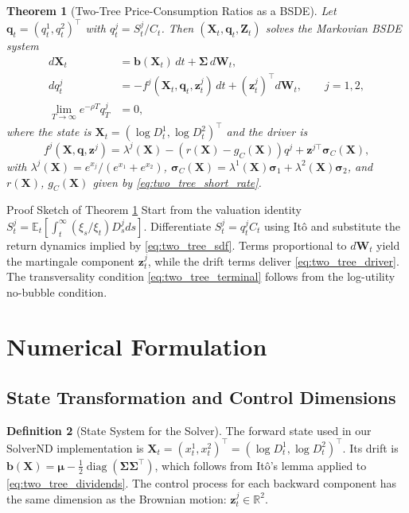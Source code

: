 \documentclass[11pt,letterpaper,oneside]{article}
\theoremstyle{plain}
\newtheorem{theorem}{Theorem}[section]
\theoremstyle{definition}
\newtheorem{definition}[theorem]{Definition}
\theoremstyle{remark}
\begin{document}
\begin{theorem}[Two-Tree Price-Consumption Ratios as a BSDE]
\label{thm:two_tree_bsde}
Let $\bm{q}_t = (q^1_t,q^2_t)^\top$ with $q^j_t = S^j_t / C_t$. Then $(\bm{X}_t, \bm{q}_t, \bm{Z}_t)$ solves the Markovian BSDE system
\begin{align}
  d\bm{X}_t &= \bm{b}(\bm{X}_t)\,dt + \bm{\Sigma}\,d\bm{W}_t, \label{eq:two_tree_forward} \\
  dq^j_t &= -f^j(\bm{X}_t, \bm{q}_t, \bm{z}^j_t)\,dt + (\bm{z}^j_t)^\top d\bm{W}_t, \qquad j=1,2, \label{eq:two_tree_backward} \\
  \lim_{T\to\infty} e^{-\rho T} q^j_T &= 0, \label{eq:two_tree_terminal}
\end{align}
where the state is $\bm{X}_t = (\log D^1_t, \log D^2_t)^\top$ and the driver is
\begin{equation}
\label{eq:two_tree_driver}
  f^j(\bm{X}, \bm{q}, \bm{z}^j) = \lambda^j(\bm{X}) - ( r(\bm{X}) - g_C(\bm{X}) ) q^j + \bm{z}^{j\top} \bm{\sigma}_C(\bm{X}),
\end{equation}
with $\lambda^j(\bm{X}) = e^{x_j}/(e^{x_1} + e^{x_2})$, $\bm{\sigma}_C(\bm{X}) = \lambda^1(\bm{X}) \bm{\sigma}_1 + \lambda^2(\bm{X}) \bm{\sigma}_2$, and $r(\bm{X})$, $g_C(\bm{X})$ given by \eqref{eq:two_tree_short_rate}.
\end{theorem}

\begin{leanproofbox}{Proof Sketch of Theorem \ref{thm:two_tree_bsde}}
Start from the valuation identity $S^j_t = \mathbb{E}_t[\int_t^{\infty} (\xi_s/\xi_t) D^j_s ds]$. Differentiate $S^j_t = q^j_t C_t$ using It\^o and substitute the return dynamics implied by \eqref{eq:two_tree_sdf}. Terms proportional to $d\bm{W}_t$ yield the martingale component $\bm{z}^j_t$, while the drift terms deliver \eqref{eq:two_tree_driver}. The transversality condition \eqref{eq:two_tree_terminal} follows from the log-utility no-bubble condition.
\end{leanproofbox}

\section{Numerical Formulation}
\label{sec:two_tree_numerics}

\subsection{State Transformation and Control Dimensions}

\begin{definition}[State System for the Solver]
The forward state used in our SolverND implementation is $\bm{X}_t = (x^1_t, x^2_t)^\top = (\log D^1_t, \log D^2_t)^\top$. Its drift is $\bm{b}(\bm{X}) = \bm{\mu} - \tfrac{1}{2}\operatorname{diag}(\bm{\Sigma}\bm{\Sigma}^\top)$, which follows from It\^o's lemma applied to \eqref{eq:two_tree_dividends}. The control process for each backward component has the same dimension as the Brownian motion: $\bm{z}^j_t\in\mathbb{R}^2$.
\end{definition}
\end{document}
